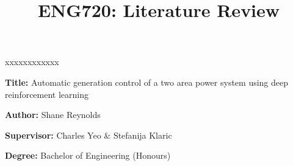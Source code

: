\documentclass[12pt]{article}
\title{ENG720: Literature Review}
\author{}
\date{}
\begin{document}
	\maketitle

	\begin{namelist}{xxxxxxxxxxxx}
		\item[{\bf Title:}]
			Automatic generation control of a two area power system using deep reinforcement learning
		\item[{\bf Author:}]
			Shane Reynolds
		\item[{\bf Supervisor:}]
			Charles Yeo \& Stefanija Klaric
		\item[{\bf Degree:}]
			Bachelor of Engineering (Honours)
	\end{namelist}


	

    \cleardoublepage
      {}                    
    \printbibliography
    
\end{document}
